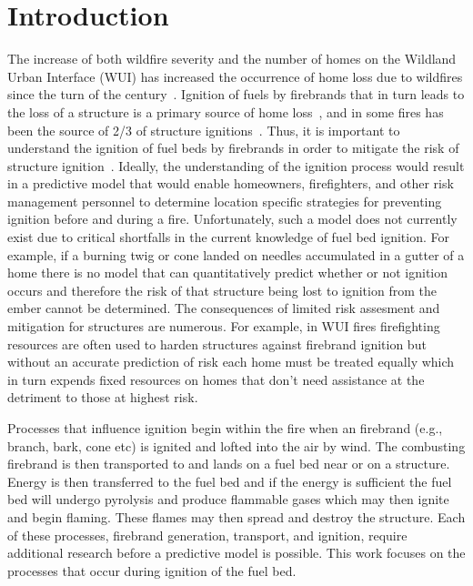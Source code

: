 \section{Introduction}
    The increase of both wildfire severity and the number of homes on the Wildland Urban Interface (WUI) has increased the occurrence of home loss due to wildfires since the turn of the century~\cite{Manzello2013}. Ignition of fuels by firebrands that in turn leads to the loss of a structure is a primary source of home loss~\cite{Koo2010a, Syphard2019, Roberts2021}, and in some fires has been the source of 2/3 of structure ignitions~\cite{Maranghides2013NISTIgnitions}. Thus, it is important to understand the ignition of fuel beds by firebrands in order to mitigate the risk of structure ignition~\cite{Manzello2014}. Ideally, the understanding of the ignition process would result in a predictive model that would enable homeowners, firefighters, and other risk management personnel to determine location specific strategies for preventing ignition before and during a fire. Unfortunately, such a model does not currently exist due to critical shortfalls in the current knowledge of fuel bed ignition. For example, if a burning twig or cone landed on needles accumulated in a gutter of a home there is no model that can quantitatively predict whether or not ignition occurs and therefore the risk of that structure being lost to ignition from the ember cannot be determined. The consequences of  limited risk assesment and mitigation for structures are numerous. For example, in WUI fires firefighting resources are often used to harden structures against firebrand ignition but without an accurate prediction of risk each home must be treated equally which in turn expends fixed resources on homes that don't need assistance at the detriment to those at highest risk. 
    
    Processes that influence ignition begin within the fire when an firebrand (e.g., branch, bark, cone etc) is ignited and lofted into the air by wind. The combusting firebrand is then transported to and lands on a fuel bed near or on a structure. Energy is then transferred to the fuel bed and if the energy is sufficient the fuel bed will undergo pyrolysis and produce flammable gases which may then ignite and begin flaming. These flames may then spread and destroy the structure. Each of these processes, firebrand generation, transport, and ignition, require additional research before a predictive model is possible. This work focuses on the processes that occur during ignition of the fuel bed.
    
